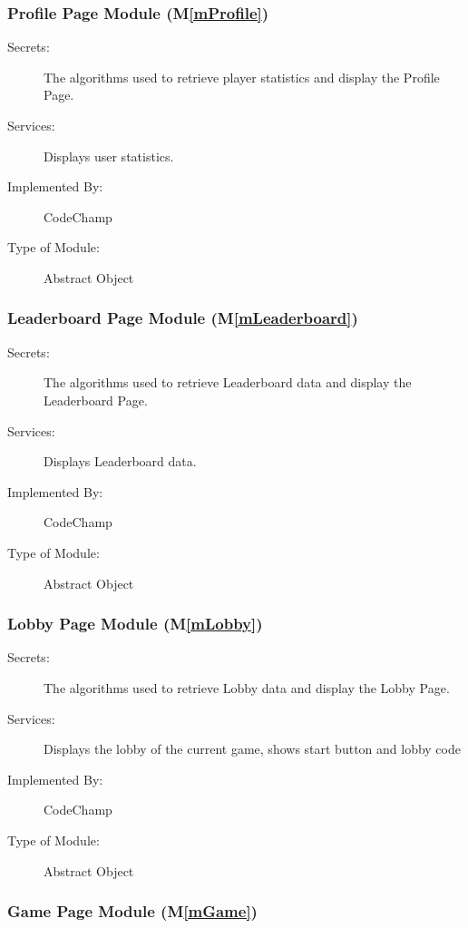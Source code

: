 \documentclass[12pt, titlepage]{article}
\newcommand{\mref}[1]{M\ref{#1}}
\begin{document}
\subsubsection{ Profile Page Module (\mref{mProfile})}

\begin{description} 
\item[Secrets:] The algorithms used to retrieve player statistics and display the Profile Page.
\item[Services:] Displays user statistics.
\item[Implemented By:] CodeChamp
\item[Type of Module:] Abstract Object
\end{description}

\subsubsection{ Leaderboard Page Module (\mref{mLeaderboard})}

\begin{description}
\item[Secrets:] The algorithms used to retrieve Leaderboard data and display the Leaderboard Page.
\item[Services:] Displays Leaderboard data.
\item[Implemented By:] CodeChamp
\item[Type of Module:] Abstract Object
\end{description}

\subsubsection{ Lobby Page Module (\mref{mLobby})}

\begin{description}
\item[Secrets:] The algorithms used to retrieve Lobby data and display the Lobby Page.
\item[Services:] Displays the lobby of the current game, shows start button and lobby code
\item[Implemented By:] CodeChamp
\item[Type of Module:] Abstract Object
\end{description}

\subsubsection{ Game Page Module (\mref{mGame})}
\end{document}
